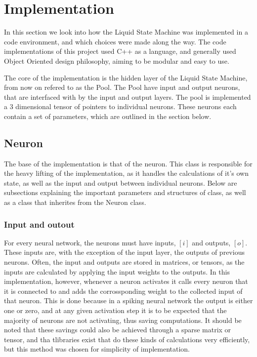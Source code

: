 \chapter{Implementation}

In this section we look into how the Liquid State Machine was implemented in a code environment, and which choices were made along the way.
The code implementations of this project used C++ as a language, and generally used Object Oriented design philosophy, aiming to be modular and easy to use.

The core of the implementation is the hidden layer of the Liquid State Machine, from now on refered to as the Pool. The Pool have input and output neurons, that are interfaced with by the input and output layers. %
The pool is implemented a 3 dimensional tensor of pointers to individual neurons. These neurons each contain a set of parameters, which are outlined in the section below.

\section{Neuron}

The base of the implementation is that of the neuron. This class is responsible for the heavy lifting of the implementation, as it handles the calculations of it's own state, as well as the input and output between individual neurons. Below are subsections explaining the important parameters and structures of class, as well as a class that inherites from the Neuron class.

\subsection{Input and outout}

For every neural network, the neurons must have inputs, $[i]$ and outputs, $[o]$. These inputs are, with the exception of the input layer, the outputs of previous neurons. Often, the input and outputs are stored in matrices, or tensors, as the inputs are calculated by applying the input weights to the outputs. In this implementation, however, whenever a neuron activates it calls every neuron that it is connected to and adds the corrossponding weight to the collected input of that neuron. This is done because in a spiking neural network the output is either one or zero, and at any given activation step it is to be expected that the majority of neurons are not activating, thus saving computations. It should be noted that these savings could also be achieved through a sparse matrix or tensor, and tha tlibraries exist that do these kinds of calculations very efficiently, but this method was chosen for simplicity of implementation.

